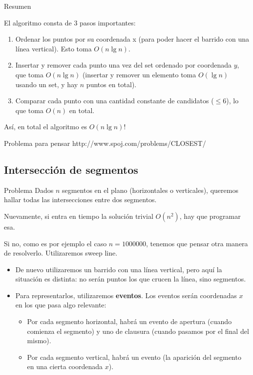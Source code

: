\documentclass[compress]{beamer}
\begin{document}
\begin{frame}{Resumen}

El algoritmo consta de 3 pasos importantes:

\begin{enumerate}
\item Ordenar los puntos por su coordenada x (para poder hacer el barrido con una l\'inea vertical). Esto toma $O(n \lg n)$.
\item Insertar y remover cada punto una vez del set ordenado por coordenada $y$, que toma $O(n \lg n)$ (insertar y remover un elemento toma $O(\lg n)$ usando un set, y hay $n$ puntos en total).
\item Comparar cada punto con una cantidad constante de candidatos ($\leq 6$), lo que toma $O(n)$ en total.
\end{enumerate}
   
As\'i, en total el algoritmo es $O(n \lg n)$!
\end{frame}

\begin{frame}{Problema para pensar}
http://www.spoj.com/problems/CLOSEST/
\end{frame}

\subsection{Intersecci\'on de segmentos}

\begin{frame}
\begin{block}{Problema}
Dados $n$ segmentos en el plano (horizontales o verticales), queremos hallar todas las intersecciones entre dos segmentos.
\end{block}

\bigskip
Nuevamente, si entra en tiempo la soluci\'on trivial $O(n^2)$, hay que programar esa.
\bigskip

Si no, como es por ejemplo el caso $n = 1000000$, tenemos que pensar otra manera de resolverlo. Utilizaremos sweep line.

\end{frame}

\begin{frame}
\begin{itemize}
\item De nuevo utilizaremos un barrido con una l\'inea vertical, pero aqu\'i la situaci\'on es distinta: no ser\'an puntos los que crucen la l\'inea, sino segmentos.
\bigskip
\item Para representarlos, utilizaremos \textbf{eventos}. Los eventos ser\'an coordenadas $x$ en los que pasa algo relevante:
\bigskip
\begin{itemize}
\item Por cada segmento horizontal, habr\'a un evento de apertura (cuando comienza el segmento) y uno de clausura (cuando pasamos por el final del mismo). 
\bigskip

\item Por cada segmento vertical, habr\'a un evento (la aparici\'on del segmento en una cierta coordenada $x$).
\end{itemize}
\end{itemize}
\end{frame}
\end{document}
